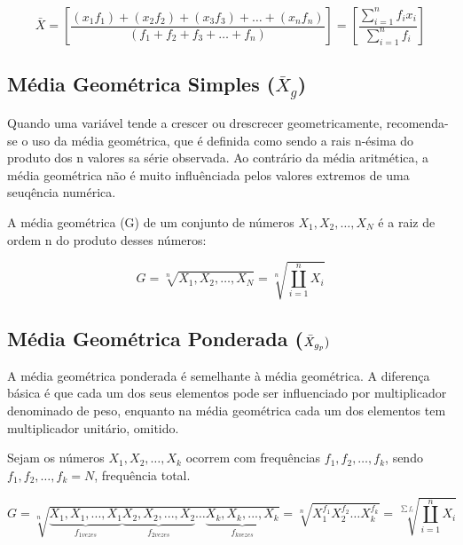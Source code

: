 \begin{equation}\label{media2}
     \bar{X}= \left[ \frac{(x_{1}f_{1}) + (x_{2}f_{2}) + (x_{3}f_{3})+
 \ldots + (x_{n}f_{n})}{(f_{1}+f_{2}+f_{3}+\ldots+f_{n})} \right ]=   \left[\frac{\sum_{i=1}^{n}f_{i}x_{i}}{\sum_{i=1}^{n}f_{i}} \right ]
\end{equation}


\newpage
\subsection{Média Geométrica Simples ($\bar{X}_{g}$)}

Quando uma variável tende a crescer ou drescrecer geometricamente, recomenda-se o uso da média geométrica, que é definida como sendo a rais n-ésima do produto dos n valores sa série observada. Ao contrário da média aritmética, a média geométrica não é muito influênciada pelos valores extremos de uma seuqência numérica.\vskip0.3cm


A média geométrica (G) de um conjunto de números $X_{1},X_{2},\ldots,X_{N}$ é a raiz de ordem n do produto
desses números:

\begin{equation}\label{Geometrica}
    G=\sqrt[n]{X_{1},X_{2},\ldots,X_{N}}=\sqrt[n]{\coprod_{i=1}^{n}X_{i}}
\end{equation}


\subsection{Média Geométrica Ponderada ($\Bar{X}_{g_{p}})$}

A média geométrica ponderada é semelhante à média geométrica. A diferença básica é que cada um dos seus elementos pode ser influenciado por multiplicador denominado de peso, enquanto na média geométrica cada um dos elementos tem multiplicador unitário, omitido.\vskip0.3cm


Sejam os números $X_{1},X_{2},\ldots,X_{k}$ ocorrem com frequências $f_{1},f_{2},\ldots,f_{k}$, sendo $f_{1},f_{2},\ldots,f_{k}=N$, frequência total.


\begin{equation}\label{Geometrica}
    G=\sqrt[n]{\underbrace{X_{1},X_{1},...,X_{1}}_{f_{1vezes}}\underbrace{X_{2},X_{2},...,X_{2}}_{f_{2vezes}} \ldots \underbrace{X_{k},X_{k},...,X_{k}}_{f_{kvezes}}}=\sqrt[n]{X_{1}^{f_{1}}X_{2}^{f_{2}}\ldots X_{k}^{f_{k}}}
 = \sqrt[\sum f_{i}]{\coprod_{i=1}^{n}X_{i}}
\end{equation}

